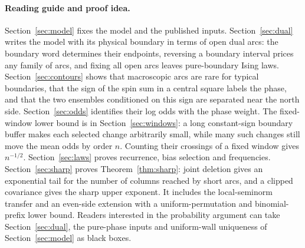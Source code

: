 \paragraph{Reading guide and proof idea.}
Section~\ref{sec:model} fixes the model and the published inputs. Section~\ref{sec:dual} writes the model with its physical boundary in terms of open dual arcs: the boundary word determines their endpoints, reversing a boundary interval prices any family of arcs, and fixing all open arcs leaves pure-boundary Ising laws. Section~\ref{sec:contours} shows that macroscopic arcs are rare for typical boundaries, that the sign of the spin sum in a central square labels the phase, and that the two ensembles conditioned on this sign are separated near the north side. Section~\ref{sec:odds} identifies their log odds with the phase weight. The fixed-window lower bound is in Section~\ref{sec:windows}: a long constant-sign boundary buffer makes each selected change arbitrarily small, while many such changes still move the mean odds by order $n$. Counting their crossings of a fixed window gives $n^{-1/2}$. Section~\ref{sec:laws} proves recurrence, bias selection and frequencies. Section~\ref{sec:sharp} proves Theorem~\ref{thm:sharp}: joint deletion gives an exponential tail for the number of columns reached by short arcs, and a clipped covariance gives the sharp upper exponent. It includes the local-seminorm transfer and an even-side extension with a uniform-permutation and binomial-prefix lower bound. Readers interested in the probability argument can take Section~\ref{sec:dual}, the pure-phase inputs and uniform-wall uniqueness of Section~\ref{sec:model} as black boxes.
